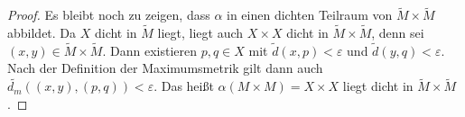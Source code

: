 \begin{proof}
  Es bleibt noch zu zeigen, dass $\alpha$ in einen dichten Teilraum von $\widetilde{M} \times \widetilde{M}$ abbildet. Da $X$ dicht in $\widetilde{M}$ liegt, liegt auch $X \times X$ dicht in $\widetilde{M} \times \widetilde{M}$, denn sei $(x,y) \in \widetilde{M} \times \widetilde{M}$. Dann existieren $p,q \in X$ mit $\widetilde{d}(x,p)<\varepsilon$ und $\widetilde{d}(y,q)<\varepsilon$. Nach der Definition der Maximumsmetrik gilt dann auch $\widetilde{d_m}((x,y),(p,q)) < \varepsilon$. Das heißt $\alpha(M \times M)=X \times X$ liegt dicht in $\widetilde{M} \times \widetilde{M}$.
\end{proof}
